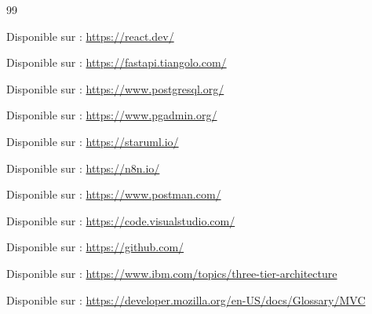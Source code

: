 \documentclass[11pt,titlepage,a4paper,openany]{book}
\begin{document}
\begin{thebibliography}{99}
	
	Disponible sur :
	\url{https://react.dev/}
	
	Disponible sur :
	\url{https://fastapi.tiangolo.com/}
	
	Disponible sur :
	\url{https://www.postgresql.org/}
	
	Disponible sur :
	\url{https://www.pgadmin.org/}
	
	Disponible sur :
	\url{https://staruml.io/}
	
	Disponible sur :
	\url{https://n8n.io/}
	
	Disponible sur :
	\url{https://www.postman.com/}
	
	Disponible sur :
	\url{https://code.visualstudio.com/}
	
	Disponible sur :
	\url{https://github.com/}
	
	Disponible sur :
	\url{https://www.ibm.com/topics/three-tier-architecture}
	
	Disponible sur :
	\url{https://developer.mozilla.org/en-US/docs/Glossary/MVC}
	
\end{thebibliography}
\end{document}
